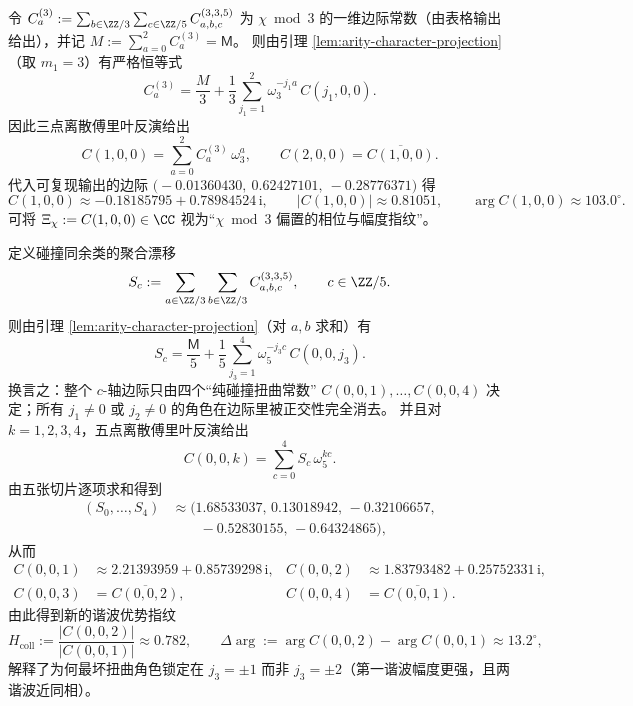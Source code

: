 \begin{corollary}\label{cor:arity-335-marginal-invert-chi}
令 \(C^{(3)}_a:=\sum_{b\in\ZZ/3}\sum_{c\in\ZZ/5}C^{(3,3,5)}_{a,b,c}\) 为 \(\chi\bmod 3\) 的一维边际常数（由表格输出给出），并记 \(M:=\sum_{a=0}^2 C^{(3)}_a=\mathsf{M}\)。
则由引理 \ref{lem:arity-character-projection}（取 \(m_1=3\)）有严格恒等式
\[
C^{(3)}_a=\frac{M}{3}+\frac13\sum_{j_1=1}^{2}\omega_3^{-j_1a}\,C(j_1,0,0).
\]
因此三点离散傅里叶反演给出
\[
C(1,0,0)=\sum_{a=0}^{2}C^{(3)}_a\,\omega_3^{a},\qquad
C(2,0,0)=\overline{C(1,0,0)}.
\]
代入可复现输出的边际 \(\bigl(-0.01360430,\ 0.62427101,\ -0.28776371\bigr)\) 得
\[
C(1,0,0)\approx -0.18185795+0.78984524\,\mathrm{i},
\qquad
|C(1,0,0)|\approx 0.81051,
\qquad
\arg C(1,0,0)\approx 103.0^\circ.
\]
可将 \(\Xi_\chi:=C(1,0,0)\in\CC\) 视为“\(\chi\bmod 3\) 偏置的相位与幅度指纹”。
\end{corollary}

\begin{corollary}\label{cor:arity-335-marginal-invert-collision}
定义碰撞同余类的聚合漂移
\[
S_c:=\sum_{a\in\ZZ/3}\sum_{b\in\ZZ/3}C^{(3,3,5)}_{a,b,c},
\qquad c\in\ZZ/5.
\]
则由引理 \ref{lem:arity-character-projection}（对 \(a,b\) 求和）有
\[
S_c=\frac{\mathsf{M}}{5}+\frac15\sum_{j_3=1}^{4}\omega_5^{-j_3c}\,C(0,0,j_3).
\]
换言之：整个 \(c\)-轴边际只由四个“纯碰撞扭曲常数” \(C(0,0,1),\dots,C(0,0,4)\) 决定；所有 \(j_1\ne0\) 或 \(j_2\ne0\) 的角色在边际里被正交性完全消去。
并且对 \(k=1,2,3,4\)，五点离散傅里叶反演给出
\[
C(0,0,k)=\sum_{c=0}^{4}S_c\,\omega_5^{kc}.
\]
由五张切片逐项求和得到
\[
\begin{aligned}
(S_0,\dots,S_4)
&\approx(1.68533037,\,0.13018942,\,-0.32106657,\\
&\qquad -0.52830155,\,-0.64324865),
\end{aligned}
\]
从而
\[
\begin{aligned}
C(0,0,1)&\approx 2.21393959+0.85739298\,\mathrm{i},&
C(0,0,2)&\approx 1.83793482+0.25752331\,\mathrm{i},\\
C(0,0,3)&=\overline{C(0,0,2)},&
C(0,0,4)&=\overline{C(0,0,1)}.
\end{aligned}
\]
由此得到新的谐波优势指纹
\[
H_{\mathrm{coll}}:=\frac{|C(0,0,2)|}{|C(0,0,1)|}\approx 0.782,
\qquad
\Delta\arg:=\arg C(0,0,2)-\arg C(0,0,1)\approx 13.2^\circ,
\]
解释了为何最坏扭曲角色锁定在 \(j_3=\pm1\) 而非 \(j_3=\pm2\)（第一谐波幅度更强，且两谐波近同相）。
\end{corollary}

